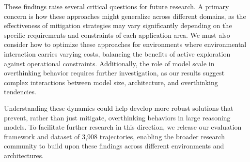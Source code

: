 These findings raise several critical questions for future research. A primary concern is how these approaches might generalize across different domains, as the effectiveness of mitigation strategies may vary significantly depending on the specific requirements and constraints of each application area. We must also consider how to optimize these approaches for environments where environmental interaction carries varying costs, balancing the benefits of active exploration against operational constraints. Additionally, the role of model scale in overthinking behavior requires further investigation, as our results suggest complex interactions between model size, architecture, and overthinking tendencies.

Understanding these dynamics could help develop more robust solutions that prevent, rather than just mitigate, overthinking behaviors in large reasoning models. To facilitate further research in this direction, we release our evaluation framework and dataset of 3,908 trajectories, enabling the broader research community to build upon these findings across different environments and architectures.

